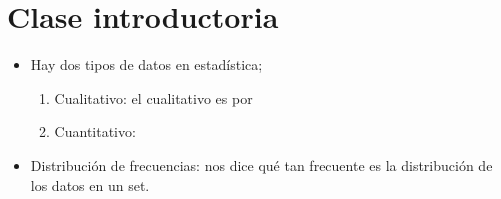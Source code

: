 \section{Clase introductoria}
\begin{itemize}
    \item Hay dos tipos de datos en estadística; 
        \begin{enumerate}
            \item Cualitativo: el cualitativo es por 
            \item Cuantitativo: 
        \end{enumerate}
    
    \item Distribución de frecuencias: nos dice qué tan frecuente es la distribución de los datos en un set.
\end{itemize}
